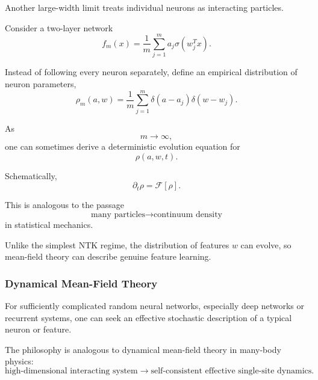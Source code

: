Another large-width limit treats individual neurons as interacting particles.

Consider a two-layer network
\begin{equation}
    f_m(x)
    =
    \frac{1}{m}
    \sum_{j=1}^m
    a_j
    \sigma(w_j^T x).
\end{equation}

Instead of following every neuron separately, define an empirical distribution
of neuron parameters,
\begin{equation}
    \rho_m(a,w)
    =
    \frac{1}{m}
    \sum_{j=1}^m
    \delta(a-a_j)
    \delta(w-w_j).
\end{equation}

As
\begin{equation}
    m\rightarrow\infty,
\end{equation}
one can sometimes derive a deterministic evolution equation for
\begin{equation}
    \rho(a,w,t).
\end{equation}

Schematically,
\begin{equation}
    \partial_t \rho
    =
    \mathcal F[\rho].
\end{equation}

This is analogous to the passage
\begin{equation}
    \text{many particles}
    \rightarrow
    \text{continuum density}
\end{equation}
in statistical mechanics.

Unlike the simplest NTK regime, the distribution of features $w$ can evolve,
so mean-field theory can describe genuine feature learning.


\subsubsection{Dynamical Mean-Field Theory}

For sufficiently complicated random neural networks, especially deep networks
or recurrent systems, one can seek an effective stochastic description of a
typical neuron or feature.

The philosophy is analogous to dynamical mean-field theory in many-body
physics:
\begin{equation}
    \boxed{
    \text{high-dimensional interacting system}
    \rightarrow
    \text{self-consistent effective single-site dynamics}.
    }
\end{equation}

